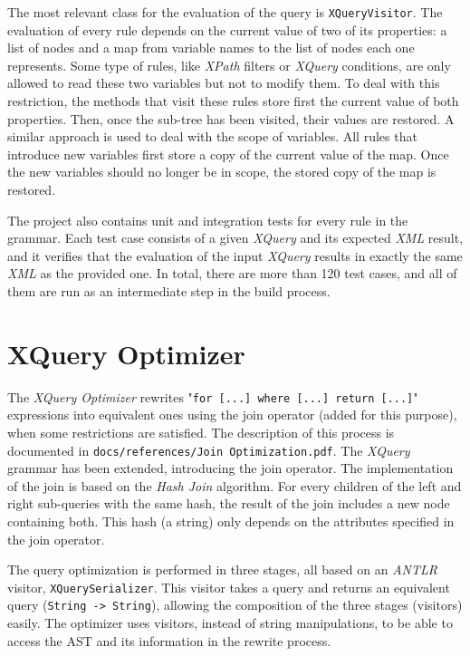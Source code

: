\documentclass[paper=letter, fontsize=11pt]{scrartcl}
\begin{document}
The most relevant class for the evaluation of the query is \texttt{XQueryVisitor}.
The evaluation of every rule depends on the current value of two of its properties: a list of nodes and a map from variable names to the list of nodes each one represents.
Some type of rules, like \textit{XPath} filters or \textit{XQuery} conditions, are only allowed to read these two variables but not to modify them.
To deal with this restriction, the methods that visit these rules store first the current value of both properties.
Then, once the sub-tree has been visited, their values are restored.
A similar approach is used to deal with the scope of variables.
All rules that introduce new variables first store a copy of the current value of the map.
Once the new variables should no longer be in scope, the stored copy of the map is restored.

The project also contains unit and integration tests for every rule in the grammar.
Each test case consists of a given \textit{XQuery} and its expected \textit{XML} result, and it verifies that the evaluation of the input \textit{XQuery} results in exactly the same \textit{XML} as the provided one.
In total, there are more than 120 test cases, and all of them are run as an intermediate step in the build process.

\section{XQuery Optimizer}

The \textit{XQuery Optimizer} rewrites "\texttt{for~[...]~where~[...]~return~[...]}" expressions into equivalent ones using the join operator (added for this purpose), when some restrictions are satisfied.
The description of this process is documented in \texttt{docs/references/Join Optimization.pdf}.
The \textit{XQuery} grammar has been extended, introducing the join operator.
The implementation of the join is based on the \textit{Hash Join} algorithm.
For every children of the left and right sub-queries with the same hash, the result of the join includes a new node containing both.
This hash (a string) only depends on the attributes specified in the join operator.

The query optimization is performed in three stages, all based on an \textit{ANTLR} visitor, \texttt{XQuerySerializer}.
This visitor takes a query and returns an equivalent query (\texttt{String~->~String}), allowing the composition of the three stages (visitors) easily.
The optimizer uses visitors, instead of string manipulations, to be able to access the AST and its information in the rewrite process.
\end{document}
